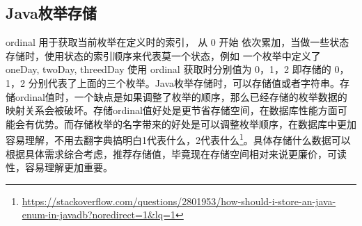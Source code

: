 \documentclass[../../../interview-questions.tex]{subfiles}
\begin{document}
\subsection{Java枚举存储}

ordinal 用于获取当前枚举在定义时的索引， 从 0 开始 依次累加，当做一些状态存储时，使用状态的索引顺序来代表莫一个状态，例如 一个枚举中定义了 oneDay, twoDay, threedDay 使用 ordinal 获取时分别值为 0，1，2 即存储的 0，1，2 分别代表了上面的三个枚举。Java枚举存储时，可以存储值或者字符串。存储ordinal值时，一个缺点是如果调整了枚举的顺序，那么已经存储的枚举数据的映射关系会被破坏。存储ordinal值好处是更节省存储空间，在数据库性能方面可能会有优势。而存储枚举的名字带来的好处是可以调整枚举顺序，在数据库中更加容易理解，不用去翻字典搞明白1代表什么，2代表什么\footnote{\url{https://stackoverflow.com/questions/2801953/how-should-i-store-an-java-enum-in-javadb?noredirect=1&lq=1}}。具体存储什么数据可以根据具体需求综合考虑，推荐存储值，毕竟现在存储空间相对来说更廉价，可读性，容易理解更加重要。
\end{document}
